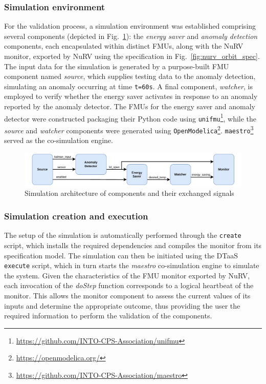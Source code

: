 \subsubsection{Simulation environment}
For the validation process, a simulation environment was established
comprising several components (depicted in Fig.~\ref{fig:nurv_fmi_simulation}): the \textit{energy saver} and \textit{anomaly detection} components, each encapsulated within distinct FMUs, along with the NuRV monitor, exported by NuRV using the specification in Fig.~\ref{fig:nurv_orbit_spec}. The input data for the simulation is generated by a purpose-built FMU component named \textit{source}, which supplies testing data to the anomaly detection, simulating an anomaly occurring at time \texttt{t=60s}. A final component, \textit{watcher}, is employed to verify whether the energy saver activates in response to an anomaly reported by the anomaly detector. The FMUs for the energy saver and anomaly detector were constructed packaging their Python code using \lstinline{unifmu}\footnote{\url{https://github.com/INTO-CPS-Association/unifmu}}, while the \textit{source} and \textit{watcher} components were generated using \lstinline{OpenModelica}\footnote{\url{https://openmodelica.org/}}. \lstinline{maestro}\footnote{\url{https://github.com/INTO-CPS-Association/maestro}} served as the co-simulation engine.%
%
\begin{figure}[ht]
	\centering
	\includegraphics[width=\textwidth]{images/FMI-communication.pdf}
	\caption{Simulation architecture of components and their exchanged signals}
	\label{fig:nurv_fmi_simulation}
\end{figure}%
%
\subsubsection{Simulation creation and execution}
The setup of the simulation is automatically performed through the \texttt{create} script, which installs the required dependencies and compiles the monitor from its specification model. The simulation can then be initiated using the DTaaS \texttt{execute} script, which in turn starts the \textit{maestro} co-simulation engine to simulate the system. Given the characteristics of the FMU monitor exported by NuRV, each invocation of the \textit{doStep} function corresponds to a logical heartbeat of the monitor. This allows the monitor component to assess the current values of its inputs and determine the appropriate outcome, thus providing the user the required information to perform the validation of the components.



